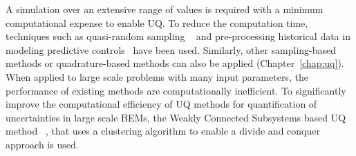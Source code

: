 



   
A simulation over an extensive range of values is required with a minimum computational expense to enable UQ.  To reduce the computation time, techniques such as quasi-random sampling ~\citep{eisenhower2012uncertainty} and pre-processing historical data in modeling predictive controls~\citep{maasoumy2014handling} have been used. Similarly, other sampling-based methods or quadrature-based methods can also be applied (Chapter~\ref{chap:uq}). When applied to large scale problems with many input parameters, the performance of existing methods are computationally inefficient. To significantly improve the computational efficiency of UQ methods for quantification of uncertainties in large scale BEMs, the Weakly Connected Subsystems based UQ method ~\citep{Mukherjee_2017,mukherjee2015non,mukherjee2015laplacian}, that uses a clustering algorithm to enable a divide and conquer approach is used.



